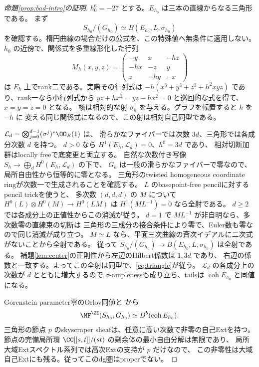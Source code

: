 \begin{proof}[命題\ref{prop:bad-intro}の証明]
 \(h_0^6=-27\) とする。\(E_{h_0}\) は三本の直線からなる三角形である。
 まず
 \[
 S_{h_0}/(G_{h_0})\simeq B(E_{h_0},L,\sigma_{h_0})                 \tag{6}\label{eq:triangle}
 \]
 を確認する。楕円曲線の場合だけの公式を、この特殊値へ無条件に適用しない。
 \(h_0\) の近傍で、関係式を多重線形化した行列
 \[
 M_h(x,y,z)=
 \begin{pmatrix}-y&x&-hz\\-hx&-z&y\\z&-hy&-x\end{pmatrix}
 \]
 は \(E_h\) 上でrank二である。実際その行列式は
 \(-h(x^3+y^3+z^3+h^2xyz)\) であり、rank一なら小行列式から
 \(yz+hx^2=yz-hx^2=0\) と巡回的な式を得て、\(x=y=z=0\) となる。
 核は相対的な射 \(\sigma_h\) を与える。グラフを転置すると \(h\) を \(-h\) に
 変える同じ関係式になるので、この射は相対自己同型である。

 \(\mathcal L_d=\bigotimes_{j=0}^{d-1}(\sigma^j)^*\OO_E(1)\) は、
 滑らかなファイバーでは次数 \(3d\)、三角形では各成分次数 \(d\) を持つ。
 \(d>0\) なら \(H^1(E_h,\mathcal L_d)=0\)、\(h^0=3d\) であり、
 相対切断加群はlocally freeで底変更と両立する。
 自然な次数付き写像 \(S_h\to\bigoplus_dH^0(E_h,\mathcal L_d)\) の下で、
 \(G_h\) は一般の滑らかなファイバーで零なので、局所自由性から恒等的に零となる。
 三角形のtwisted homogeneous coordinate ringが次数一で生成されることを確認する。
 \(L\) のbasepoint-free pencilに対するpencil trickを使うと、
 多次数 \((d,d,d)\) の \(M\) について
 \(H^0(L)\otimes H^0(M)\to H^0(LM)\) は
 \(H^1(ML^{-1})=0\) なら全射である。
 \(d\ge2\) では各成分上の正値性からこの消滅が従う。
 \(d=1\) で \(ML^{-1}\) が非自明なら、多次数零の直線束の切断は
 三角形の三成分の接合条件により零で、Euler数も零なので同じ消滅が成り立つ。
 \(M\simeq L\) なら、平面三次曲線の斉次イデアルに二次式がないことから全射である。
 従って \(S_{h_0}/(G_{h_0})\to B(E_{h_0},L,\sigma_{h_0})\) は全射である。
 補題\ref{lem:center}の正則性から左辺のHilbert係数は \(1,3d\) であり、
 右辺の係数と一致する。よってこの全射は同型で、\eqref{eq:triangle}が従う。
 \(\mathcal L_d\) の各成分上の次数が \(d\) とともに増大するので
 \(\sigma\)-amplenessも成り立ち、tailsは \(\operatorname{coh}E_{h_0}\) と同値になる。

 Gorenstein parameter零のOrlov同値と \cite[Theorem 5.8]{CCKM}から
 \[
 \MF^\ZZ(S_{h_0},G_{h_0})\simeq D^b(\operatorname{coh}E_{h_0}).
 \]
 三角形の節点 \(p\) のskyscraper sheafは、任意に高い次数で非零の自己Extを持つ。
 節点の完備局所環 \(\CC[[s,t]]/(st)\) の剰余体の最小自由分解は無限であり、
 局所大域Extスペクトル系列では高次Extの支持が \(p\) だけなので、
 この非零性は大域自己Extにも残る。従ってこのdg圏はproperでない。


\end{proof}
